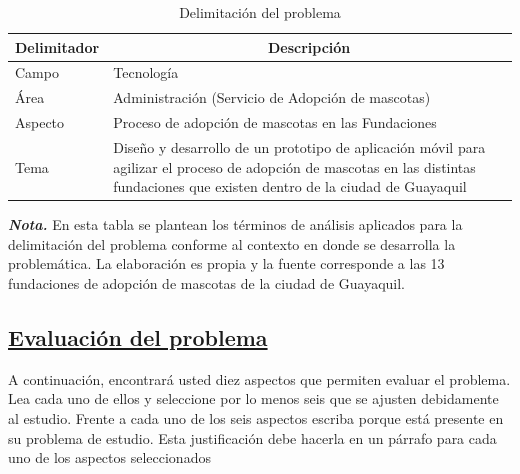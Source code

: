 \documentclass[12pt, a4paper, nofontenc, numbers=endperiod]{apa7}
\begin{document}
{	\begin{table}[h]
		\caption{Delimitación del problema}
		\label{Tabla1} %

		{\renewcommand{\arraystretch}{1.5} 
			\begin{tabular}{p{6cm}p{9.1cm}}
				\toprule
				\multicolumn{1}{c}{Delimitador} &  \multicolumn{1}{c}{Descripción} \\
				\midrule
				Campo & Tecnología \\
				
				Área &  Administración (Servicio de Adopción de mascotas) \\
				
				Aspecto &  Proceso de adopción de mascotas en las Fundaciones \\
				
				Tema & Diseño y desarrollo de un prototipo de aplicación móvil para agilizar el proceso de adopción de mascotas en las distintas fundaciones que existen dentro de la ciudad de Guayaquil
				\\ \midrule
			\end{tabular}
		\begin{tablenotes}[para,flushleft]
			{\small
				\textit{\textbf{Nota.}} En esta tabla se plantean los términos de análisis aplicados para la delimitación del problema conforme al contexto en donde se desarrolla la problemática. La elaboración es propia y la fuente corresponde a las 13 fundaciones de adopción de mascotas de la ciudad de Guayaquil.
			}
		\end{tablenotes}
		}
	\end{table}
		\vspace*{-1cm}
		\subsection*{\normalsize \centering \underline{Evaluación del problema}}
		\setlength{\parindent}{1.27cm}A continuación, encontrará usted diez aspectos que permiten evaluar el problema. Lea cada uno de ellos y seleccione por lo menos seis que se ajusten debidamente al estudio. Frente a cada uno de los seis aspectos escriba porque está presente en su problema de estudio. Esta justificación debe hacerla en un párrafo para cada uno de los aspectos seleccionados 
		
}
\end{document}
